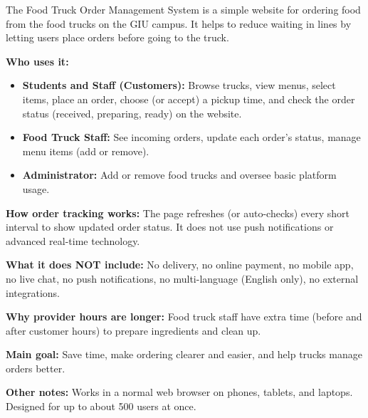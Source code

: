 \documentclass[12pt,a4paper]{article}
\begin{document}
\begin{tcolorbox}[colback=lightgray, colframe=secondaryblue, boxrule=0.8pt, arc=3pt, left=10pt, right=10pt, top=8pt, bottom=8pt]

The Food Truck Order Management System is a simple website for ordering food from the food trucks on the GIU campus. It helps to reduce waiting in lines by letting users place orders before going to the truck.

\vspace{0.5em}

{\bfseries\color{secondaryblue} Who uses it:}
\begin{itemize}[leftmargin=1.8em,itemsep=5pt, topsep=6pt]
  \item \textbf{Students and Staff (Customers):} Browse trucks, view menus, select items, place an order, choose (or accept) a pickup time, and check the order status (received, preparing, ready) on the website.
  \item \textbf{Food Truck Staff:} See incoming orders, update each order's status, manage menu items (add or remove).
  \item \textbf{Administrator:} Add or remove food trucks and oversee basic platform usage.
\end{itemize}

\vspace{0.3em}

{\bfseries\color{secondaryblue} How order tracking works:} The page refreshes (or auto-checks) every short interval to show updated order status. It does not use push notifications or advanced real-time technology.

\vspace{0.3em}

{\bfseries\color{secondaryblue} What it does NOT include:} No delivery, no online payment, no mobile app, no live chat, no push notifications, no multi-language (English only), no external integrations.

\vspace{0.3em}

{\bfseries\color{secondaryblue} Why provider hours are longer:} Food truck staff have extra time (before and after customer hours) to prepare ingredients and clean up.

\vspace{0.3em}

{\bfseries\color{secondaryblue} Main goal:} Save time, make ordering clearer and easier, and help trucks manage orders better.

\vspace{0.3em}

{\bfseries\color{secondaryblue} Other notes:} Works in a normal web browser on phones, tablets, and laptops. Designed for up to about 500 users at once.

\end{tcolorbox}
\end{document}
